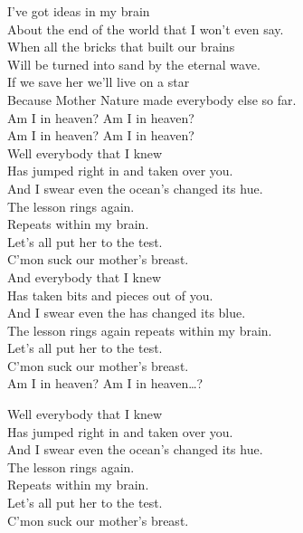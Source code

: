 



I've got ideas in my brain \\
About the end of the world that I won't even say. \\
When all the bricks that built our brains \\
Will be turned into sand by the eternal wave. \\
If we save her we'll live on a star \\
Because Mother Nature made everybody else so far. \\

Am I in heaven? Am I in heaven? \\
Am I in heaven? Am I in heaven? \\

Well everybody that I knew \\
Has jumped right in and taken over you. \\
And I swear even the ocean's changed its hue. \\
The lesson rings again. \\
Repeats within my brain. \\
Let's all put her to the test. \\
C'mon suck our mother's breast. \\

And everybody that I knew\\
Has taken bits and pieces out of you. \\
And I swear even the  has changed its blue. \\
The lesson rings again repeats within my brain. \\
Let's all put her to the test. \\
C'mon suck our mother's breast. \\

Am I in heaven? Am I in heaven…?

Well everybody that I knew \\
Has jumped right in and taken over you. \\
And I swear even the ocean's changed its hue. \\
The lesson rings again. \\
Repeats within my brain. \\
Let's all put her to the test. \\
C'mon suck our mother's breast. \\

